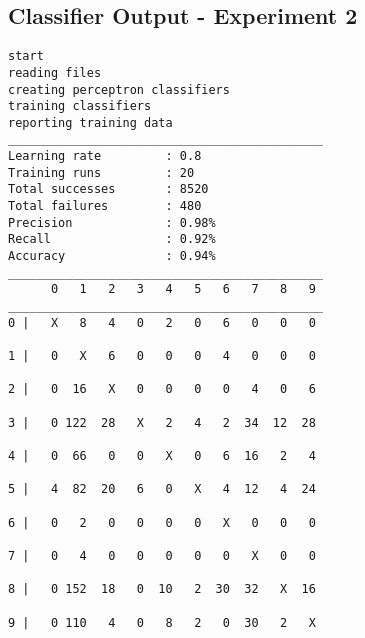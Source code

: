 \documentclass[titlepage,11pt]{article}
\begin{document}
\subsection{Classifier Output - Experiment 2} {
\begin{verbatim}
start
reading files
creating perceptron classifiers
training classifiers
reporting training data
____________________________________________
Learning rate         : 0.8
Training runs         : 20
Total successes       : 8520
Total failures        : 480
Precision             : 0.98%
Recall                : 0.92%
Accuracy              : 0.94%
____________________________________________
      0   1   2   3   4   5   6   7   8   9
____________________________________________
0 |   X   8   4   0   2   0   6   0   0   0

1 |   0   X   6   0   0   0   4   0   0   0

2 |   0  16   X   0   0   0   0   4   0   6

3 |   0 122  28   X   2   4   2  34  12  28

4 |   0  66   0   0   X   0   6  16   2   4

5 |   4  82  20   6   0   X   4  12   4  24

6 |   0   2   0   0   0   0   X   0   0   0

7 |   0   4   0   0   0   0   0   X   0   0

8 |   0 152  18   0  10   2  30  32   X  16

9 |   0 110   4   0   8   2   0  30   2   X


\end{verbatim}}
\end{document}
